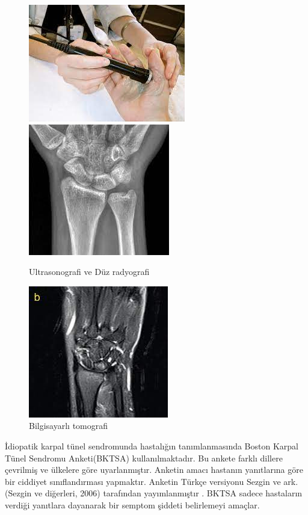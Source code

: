 \documentclass[12pt,twoside]{deuthesis}
\begin{document}
\begin{figure}

{\centering \includegraphics[width=0.49\linewidth,height=0.22\textheight]{figure/ultraradyo} \includegraphics[width=0.49\linewidth,height=0.22\textheight]{figure/radyog} 

}

\caption{Ultrasonografi ve Düz radyografi }\label{fig:unnamed-chunk-5}
\end{figure}
\begin{figure}

{\centering \includegraphics[width=0.49\linewidth,height=0.22\textheight]{figure/bt} 

}

\caption{Bilgisayarlı tomografi }\label{fig:unnamed-chunk-6}
\end{figure}
İdiopatik karpal tünel sendromunda hastalığın tanımlanmasında Boston Karpal Tünel Sendromu
Anketi(BKTSA) kullanılmaktadır. Bu ankete farklı dillere çevrilmiş ve ülkelere göre uyarlanmıştır. Anketin amacı hastanın yanıtlarına göre bir ciddiyet sınıflandırması yapmaktır. Anketin Türkçe versiyonu Sezgin ve ark. (Sezgin ve diğerleri, 2006) tarafından yayımlanmıştır . BKTSA sadece hastaların verdiği yanıtlara dayanarak bir semptom şiddeti belirlemeyi amaçlar.
\end{document}
